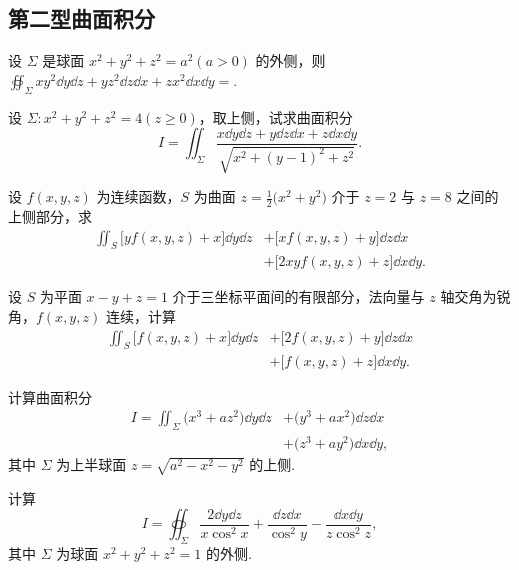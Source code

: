 \subsection{第二型曲面积分}

	\begin{ti}
		设 $\varSigma$ 是球面 $x^{2} + y^{2} + z^{2} = a^{2} (a > 0)$ 的外侧，则 $\oiint_{\varSigma} xy^{2} \dd{y}\dd{z} + yz^{2} \dd{z}\dd{x} + zx^{2} \dd{x}\dd{y} = $\htwo.
	\end{ti}

	\begin{ti}
		设 $\varSigma: x^{2} + y^{2} + z^{2} = 4 (z \geq 0)$，取上侧，试求曲面积分
		\[
			I = \iint_{\varSigma} \frac{x\dd{y}\dd{z} + y\dd{z}\dd{x} + z\dd{x}\dd{y}}{\sqrt{ x^{2} + (y - 1)^{2} + z^{2} }}.
		\]
	\end{ti}

	\begin{ti}
		设 $f(x,y,z)$ 为连续函数，$S$ 为曲面 $z = \frac{1}{2} \bigl( x^{2} + y^{2} \bigr)$ 介于 $z = 2$ 与 $z = 8$ 之间的上侧部分，求
		\begin{align*}
			\iint_{S} \bigl[ y f(x,y,z) + x \bigr] \dd{y} \dd{z} &+ \bigl[ x f(x,y,z) + y \bigr] \dd{z} \dd{x}\\
			&+ \bigl[ 2xy f(x,y,z) + z \bigr] \dd{x} \dd{y}.
		\end{align*}
	\end{ti}

	\begin{ti}
		设 $S$ 为平面 $x - y + z = 1$ 介于三坐标平面间的有限部分，法向量与 $z$ 轴交角为锐角，$f(x,y,z)$ 连续，计算
		\begin{align*}
			\iint_{S} \bigl[ f(x,y,z) + x \bigr] \dd{y} \dd{z} &+ \bigl[ 2f(x,y,z) + y \bigr] \dd{z} \dd{x}\\
			&+ \bigl[ f(x,y,z) + z \bigr] \dd{x} \dd{y}.
		\end{align*}
	\end{ti}

	\begin{ti}
		计算曲面积分
		\begin{align*}
			I = \iint_{\varSigma} \bigl( x^{3} + az^{2} \bigr) \dd{y} \dd{z} &+ \bigl( y^{3} + ax^{2} \bigr) \dd{z} \dd{x}\\
			&+ \bigl( z^{3} + ay^{2} \bigr) \dd{x} \dd{y},
		\end{align*}
		其中 $\varSigma$ 为上半球面 $z = \sqrt{a^{2} - x^{2} - y^{2}}$ 的上侧.
	\end{ti}

	\begin{ti}
		计算
		\[
			I = \oiint_{\varSigma} \frac{2 \dd{y} \dd{z}}{x \cos^{2}x} + \frac{\dd{z} \dd{x}}{\cos^{2}y} - \frac{\dd{x} \dd{y}}{z \cos^{2}z},
		\]
		其中 $\varSigma$ 为球面 $x^{2} + y^{2} + z^{2} = 1$ 的外侧.
	\end{ti}

